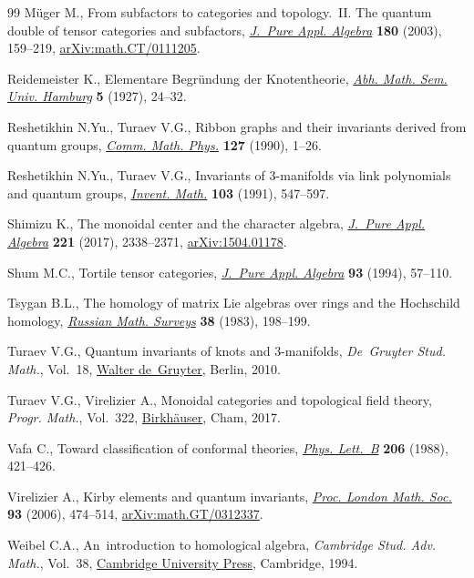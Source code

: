 \begin{thebibliography}{99}
M\"uger M., From subfactors to categories and topology.~{II}. {T}he quantum
 double of tensor categories and subfactors,
 \href{https://doi.org/10.1016/S0022-4049(02)00248-7}{\textit{J.~Pure Appl.
 Algebra}} \textbf{180} (2003), 159--219,
 \href{http://arxiv.org/abs/math.CT/0111205}{arXiv:math.CT/0111205}.

Reidemeister K., Elementare {B}egr\"undung der {K}notentheorie,
 \href{https://doi.org/10.1007/BF02952507}{\textit{Abh. Math. Sem. Univ.
 Hamburg}} \textbf{5} (1927), 24--32.

Reshetikhin N.Yu., Turaev V.G., Ribbon graphs and their invariants derived from
 quantum groups, \href{https://doi.org/10.1007/BF02096491}{\textit{Comm. Math.
 Phys.}} \textbf{127} (1990), 1--26.

Reshetikhin N.Yu., Turaev V.G., Invariants of {$3$}-manifolds via link
 polynomials and quantum groups,
 \href{https://doi.org/10.1007/BF01239527}{\textit{Invent. Math.}}
 \textbf{103} (1991), 547--597.

Shimizu K., The monoidal center and the character algebra,
 \href{https://doi.org/10.1016/j.jpaa.2016.12.037}{\textit{J.~Pure Appl.
 Algebra}} \textbf{221} (2017), 2338--2371,
 \href{http://arxiv.org/abs/1504.01178}{arXiv:1504.01178}.

Shum M.C., Tortile tensor categories,
 \href{https://doi.org/10.1016/0022-4049(92)00039-T}{\textit{J.~Pure Appl.
 Algebra}} \textbf{93} (1994), 57--110.

Tsygan B.L., The homology of matrix {L}ie algebras over rings and the
 {H}ochschild homology,
 \href{https://doi.org/10.1070/RM1983v038n02ABEH003481}{\textit{Russian Math.
 Surveys}} \textbf{38} (1983), 198--199.

Turaev V.G., Quantum invariants of knots and 3-manifolds, \textit{De~Gruyter
 Stud. Math.}, Vol.~18, \href{https://doi.org/10.1515/9783110221848}{Walter
 de~Gruyter}, Berlin, 2010.

Turaev V.G., Virelizier A., Monoidal categories and topological field theory,
 \textit{Progr. Math.}, Vol.~322,
 \href{https://doi.org/10.1007/978-3-319-49834-8}{Birkh\"auser}, Cham, 2017.

Vafa C., Toward classification of conformal theories,
 \href{https://doi.org/10.1016/0370-2693(88)91603-6}{\textit{Phys. Lett.~B}}
 \textbf{206} (1988), 421--426.

Virelizier A., Kirby elements and quantum invariants,
 \href{https://doi.org/10.1112/S0024611506015905}{\textit{Proc. London Math.
 Soc.}} \textbf{93} (2006), 474--514,
 \href{http://arxiv.org/abs/math.GT/0312337}{arXiv:math.GT/0312337}.

Weibel C.A., An~introduction to homological algebra, \textit{Cambridge Stud.
 Adv. Math.}, Vol.~38,
 \href{https://doi.org/10.1017/CBO9781139644136}{Cambridge University Press},
 Cambridge, 1994.

\end{thebibliography}
